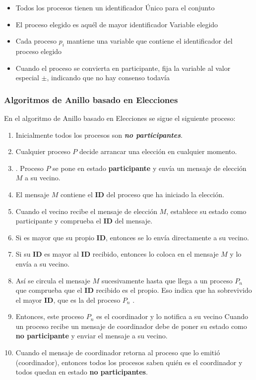 {\begin{itemize}
		\item   Todos los procesos tienen un identificador 
		Único para el conjunto 
		\item El proceso elegido es aquél de mayor identificador 
		Variable elegido 
		\item Cada proceso $p_{i}$ mantiene una variable que contiene el identificador del proceso elegido 
		\item Cuando el proceso se convierta en participante, fija la variable al valor especial $\pm$, indicando que no hay consenso todavía
		
	\end{itemize}	
 

\subsubsection{Algoritmos de Anillo basado en Elecciones}
 En el algoritmo de Anillo basado en Elecciones \cite{Chang1979} se sigue el siguiente proceso:
 
	\begin{enumerate}
		\item Inicialmente todos los procesos son \textit{\textbf{no participantes}}.
		\item Cualquier proceso $P$ decide arrancar una elección en cualquier momento.
		\item. Proceso $P$ se pone en estado \textbf{participante} y envía un mensaje de elección $M$ a su vecino.
		\item El mensaje $ M$ contiene el \textbf{ID} del proceso que ha iniciado la elección.
		\item Cuando el vecino recibe el mensaje de elección $M$, establece su estado como participante y comprueba el \textbf{ID} del mensaje.
		\item Si es mayor que su propio \textbf{ID}, entonces se lo envía directamente a su vecino.
		\item Si su \textbf{ID} es mayor al \textbf{ID} recibido, entonces lo coloca en el mensaje $M$ y lo envía a su vecino.				
 
		\item Así se circula el mensaje $M$ sucesivamente hasta que llega a un proceso $P_{n}$ que comprueba que el \textbf{ID} recibido es el propio. Eso indica que ha sobrevivido el mayor \textbf{ID}, que es la del proceso  $P_{n}$ .
		\item Entonces, este proceso  $P_{n}$  es el coordinador y lo notifica a su vecino Cuando un proceso recibe un mensaje de coordinador debe de poner su estado como \textbf{no participante }y enviar el mensaje a su vecino.
		\item Cuando el mensaje de coordinador retorna al proceso que lo emitió (coordinador), entonces todos los procesos saben quién es el coordinador y todos quedan en estado \textbf{no participantes}.
	\end{enumerate}		
	
}
